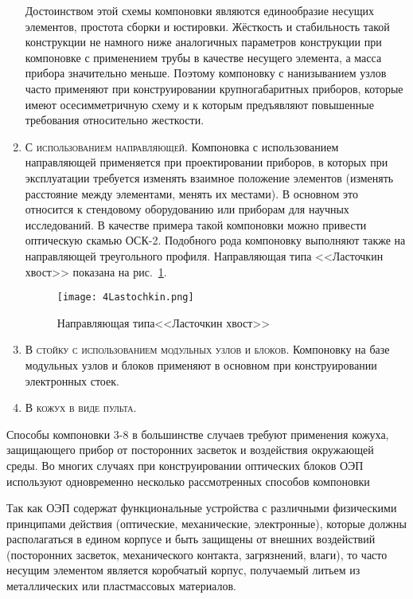 \begin{enumerate}
	Достоинством этой схемы компоновки являются единообразие несущих элементов, простота сборки и юстировки. 
	Жёсткость и стабильность такой конструкции не намного ниже аналогичных параметров конструкции при компоновке с применением трубы в качестве несущего элемента, а масса прибора значительно меньше. 
	Поэтому компоновку с нанизыванием узлов часто применяют при конструировании крупногабаритных приборов, которые имеют осесимметричную схему и к которым предъявляют повышенные требования относительно жесткости.
	
	\item \textsc{С использованием направляющей}. 
	Компоновка с использованием направляющей применяется при проектировании приборов, в которых при эксплуатации требуется изменять взаимное положение элементов (изменять расстояние между элементами, менять их местами). 
	В основном это относится к стендовому оборудованию или приборам для научных исследований. 
	В качестве примера такой компоновки можно привести оптическую скамью ОСК-2. 
	Подобного рода компоновку выполняют также на направляющей треугольного профиля. 
	Направляющая типа <<Ласточкин хвост>> показана на рис.~\ref{pic:4Lastochkin}.
	
	\begin{figure}[h!]
		\begin{center}
			\caption[Направляющая типа <<Ласточкин хвост>>]{Направляющая типа\break<<Ласточкин хвост>>}
			\texttt{[image: 4Lastochkin.png]}
			\label{pic:4Lastochkin}
		\end{center}
	\end{figure}
	
	\item \textsc{В стойку с использованием модульных узлов и блоков}. Компоновку на базе модульных узлов и блоков применяют в основном при конструировании электронных стоек.
	
	\item \textsc{В кожух в виде пульта}.
\end{enumerate}

Способы компоновки 3-8 в большинстве случаев требуют применения кожуха, защищающего прибор от посторонних засветок и воздействия окружающей среды. 
Во многих случаях при конструировании оптических блоков ОЭП используют одновременно несколько рассмотренных способов компоновки

Так как ОЭП содержат функциональные устройства с различными физическими принципами действия (оптические, механические, электронные), которые должны располагаться в едином корпусе и быть защищены от внешних воздействий (посторонних засветок, механического контакта, загрязнений, влаги), то часто несущим элементом является коробчатый корпус, получаемый литьем из металлических или пластмассовых материалов.

